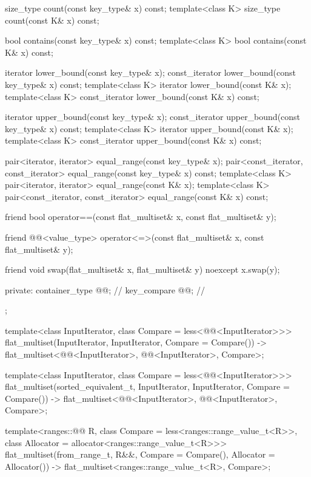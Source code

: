 \begin{codeblock}
{{    size_type count(const key_type& x) const;
    template<class K> size_type count(const K& x) const;

    bool contains(const key_type& x) const;
    template<class K> bool contains(const K& x) const;

    iterator lower_bound(const key_type& x);
    const_iterator lower_bound(const key_type& x) const;
    template<class K> iterator lower_bound(const K& x);
    template<class K> const_iterator lower_bound(const K& x) const;

    iterator upper_bound(const key_type& x);
    const_iterator upper_bound(const key_type& x) const;
    template<class K> iterator upper_bound(const K& x);
    template<class K> const_iterator upper_bound(const K& x) const;

    pair<iterator, iterator> equal_range(const key_type& x);
    pair<const_iterator, const_iterator> equal_range(const key_type& x) const;
    template<class K>
      pair<iterator, iterator> equal_range(const K& x);
    template<class K>
      pair<const_iterator, const_iterator> equal_range(const K& x) const;

    friend bool operator==(const flat_multiset& x, const flat_multiset& y);

    friend @@<value_type>
      operator<=>(const flat_multiset& x, const flat_multiset& y);

    friend void swap(flat_multiset& x, flat_multiset& y) noexcept
      { x.swap(y); }

  private:
    container_type @@;       // \expos
    key_compare @@;    // \expos
  };

  template<class InputIterator, class Compare = less<@@<InputIterator>>>
    flat_multiset(InputIterator, InputIterator, Compare = Compare())
      -> flat_multiset<@@<InputIterator>, @@<InputIterator>, Compare>;

  template<class InputIterator, class Compare = less<@@<InputIterator>>>
    flat_multiset(sorted_equivalent_t, InputIterator, InputIterator, Compare = Compare())
      -> flat_multiset<@@<InputIterator>, @@<InputIterator>, Compare>;

  template<ranges::@@ R, class Compare = less<ranges::range_value_t<R>>,
           class Allocator = allocator<ranges::range_value_t<R>>>
    flat_multiset(from_range_t, R&&, Compare = Compare(), Allocator = Allocator())
      -> flat_multiset<ranges::range_value_t<R>, Compare>;

}
\end{codeblock}
